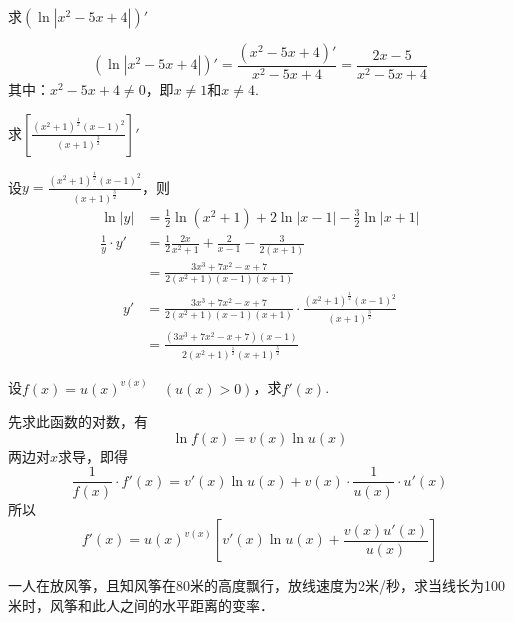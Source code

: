 \begin{example}
    求$(\ln|x^2-5x+4|)'$
\end{example}

\begin{solution}
\[(\ln|x^2-5x+4|)'=\frac{(x^2-5x+4)'}{x^2-5x+4}=\frac{2x-5}{x^2-5x+4}\]
其中：$x^2-5x+4\ne 0$，即$x\ne 1$和$x\ne 4$.
\end{solution}



\begin{example}
求$\left[\frac{(x^2+1)^{\tfrac{1}{2}}(x-1)^2}{(x+1)^{\tfrac{3}{2}}}\right]'$
\end{example}

    
\begin{solution}
设$y=\frac{(x^2+1)^{\tfrac{1}{2}}(x-1)^2}{(x+1)^{\tfrac{3}{2}}}$，则
\begin{align*}
    \ln|y|&=\frac{1}{2}\ln(x^2+1)+2\ln|x-1|-\frac{3}{2}\ln|x+1|\\
    \frac{1}{y}\cdot y'&=\frac{1}{2}\frac{2x}{x^2+1}+\frac{2}{x-1}-\frac{3}{2(x+1)}\\
    &=\frac{3x^3+7x^2-x+7}{2(x^2+1)(x-1)(x+1)}
\end{align*}    
\begin{align*}
    y'&=\frac{3x^3+7x^2-x+7}{2(x^2+1)(x-1)(x+1)}\cdot \frac{(x^2+1)^{\tfrac{1}{2}}(x-1)^2}{(x+1)^{\tfrac{3}{2}}}\\
    &=\frac{(3x^3+7x^2-x+7)(x-1)}{2(x^2+1)^{\tfrac{1}{2}}(x+1)^{\tfrac{5}{2}}}
\end{align*}
    
\end{solution}

\begin{example}
设$f(x)=u(x)^{v(x)}\quad (u(x)>0)$，求$f'(x)$.
\end{example}

\begin{solution}
先求此函数的对数，有
\[\ln f(x)=v(x)\ln u(x)\]
两边对$x$求导，即得
\[\frac{1}{f(x)}\cdot f'(x)=v'(x)\ln u(x)+v(x)\cdot\frac{1}{u(x)}\cdot u'(x)\]
    所以
\[f'(x)=u(x)^{v(x)}\left[v'(x)\ln u(x)+\frac{v(x)u'(x)}{u(x)}\right]\]
\end{solution}

\begin{example}
一人在放风筝，且知风筝在80米的高度飘行，放线速度为2米/秒，求当线长为100米时，风筝和此人之间的水平距离的变率．
\end{example}



